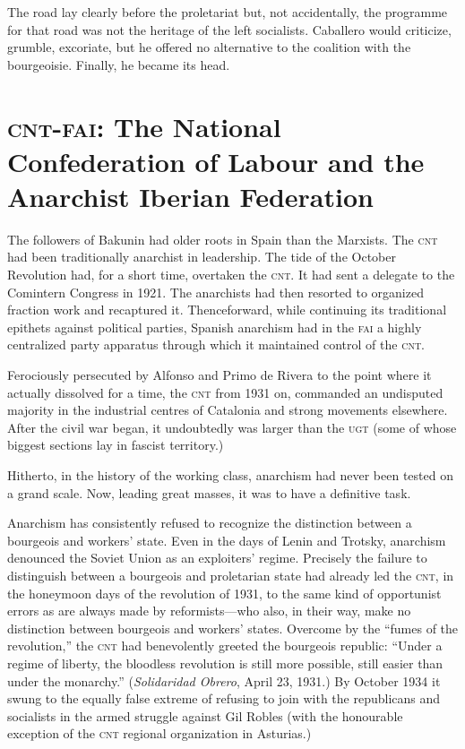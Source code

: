 The road lay clearly before the proletariat but, not accidentally, the programme for that road was not the heritage of the left socialists. Caballero would criticize, grumble, excoriate, but he offered no alternative to the coalition with the bourgeoisie. Finally, he became its head.

\section[The \textsc{cnt-fai}]{\textsc{cnt-fai}: The National Confederation of Labour and the Anarchist Iberian Federation}

The followers of Bakunin had older roots in Spain than the Marxists. The \textsc{cnt} had been traditionally anarchist in leadership. The tide of the October Revolution had, for a short time, overtaken the \textsc{cnt}. It had sent a delegate to the Comintern Congress in 1921. The anarchists had then resorted to organized fraction work and recaptured it. Thenceforward, while continuing its traditional epithets against political parties, Spanish anarchism had in the \textsc{fai} a highly centralized party apparatus through which it maintained control of the \textsc{cnt}.

Ferociously persecuted by Alfonso and Primo de Rivera to the point where it actually dissolved for a time, the \textsc{cnt} from 1931 on, commanded an undisputed majority in the industrial centres of Catalonia and strong movements elsewhere. After the civil war began, it undoubtedly was larger than the \textsc{ugt} (some of whose biggest sections lay in fascist territory.)

Hitherto, in the history of the working class, anarchism had never been tested on a grand scale. Now, leading great masses, it was to have a definitive task.

Anarchism has consistently refused to recognize the distinction between a bourgeois and workers’ state. Even in the days of Lenin and Trotsky, anarchism denounced the Soviet Union as an exploiters’ regime. Precisely the failure to distinguish between a bourgeois and proletarian state had already led the \textsc{cnt}, in the honeymoon days of the revolution of 1931, to the same kind of opportunist errors as are always made by reformists---who also, in their way, make no distinction between bourgeois and workers’ states. Overcome by the ``fumes of the revolution,'' the \textsc{cnt} had benevolently greeted the bourgeois republic: ``Under a regime of liberty, the bloodless revolution is still more possible, still easier than under the monarchy.'' (\emph{Solidaridad Obrero}, April 23, 1931.) By October 1934 it swung to the equally false extreme of refusing to join with the republicans and socialists in the armed struggle against Gil Robles (with the honourable exception of the \textsc{cnt} regional organization in Asturias.)

